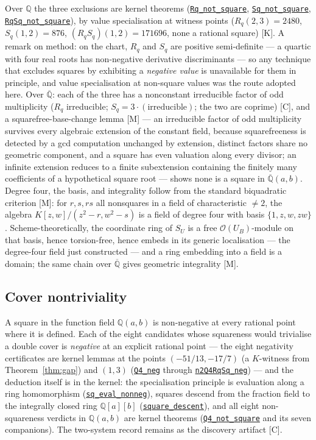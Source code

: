 \documentclass[11pt]{amsart}
\newcommand{\Q}{\mathbb{Q}}
\newcommand{\repourl}{https://github.com/hirokifukui/rd-quartics-classification}
\newcommand{\repotag}{v1.1.0}
\newcommand{\leanline}[3]{\href{\repourl/blob/\repotag/#1\#L#2}{\texttt{#3}}}
\begin{document}
Over $\Q$ the three exclusions are kernel theorems
(\leanline{Gap/BMThm7NormCriterion.lean}{60}{Rq\_not\_square},
\leanline{Gap/BMThm7NormCriterion.lean}{67}{Sq\_not\_square},
\leanline{Gap/BMThm7NormCriterion.lean}{76}{RqSq\_not\_square}), by
value specialisation at witness points
($R_{q}(2,3)=2480$, $S_{q}(1,2)=876$, $(R_{q}S_{q})(1,2)=171696$, none
a rational square) [K].  A remark on method: on the chart, $R_{q}$ and
$S_{q}$ are positive semi-definite --- a quartic with four real roots
has non-negative derivative discriminants --- so any technique that
excludes squares by exhibiting a \emph{negative value} is unavailable
for them in principle, and value specialisation at non-square values
was the route adopted here.  Over $\overline{\Q}$: each of the three has a
nonconstant irreducible factor of odd multiplicity ($R_{q}$
irreducible; $S_{q}=3\cdot(\text{irreducible})$; the two are coprime)
[C], and a squarefree-base-change lemma [M] --- an irreducible factor
of odd multiplicity survives every algebraic extension of the constant
field, because squarefreeness is detected by a gcd computation
unchanged by extension, distinct factors share no geometric component,
and a square has even valuation along every divisor; an infinite
extension reduces to a finite subextension containing the finitely
many coefficients of a hypothetical square root --- shows none is a
square in $\overline{\Q}(a,b)$.  Degree four, the basis, and
integrality follow from the standard biquadratic criterion [M]: for
$r,s,rs$ all nonsquares in a field of characteristic $\neq2$, the
algebra $K[z,w]/(z^{2}-r,w^{2}-s)$ is a field of degree four with
basis $\{1,z,w,zw\}$.  Scheme-theoretically, the coordinate ring of
$S_{U}$ is a free $\mathcal O(U_{B})$-module on that basis, hence
torsion-free, hence embeds in its generic localisation --- the
degree-four field just constructed --- and a ring embedding into a
field is a domain; the same chain over $\overline{\Q}$ gives geometric
integrality [M].

\subsection{Cover nontriviality}\label{sec:boundary:covers}

A square in the function field $\Q(a,b)$ is non-negative at every
rational point where it is defined.  Each of the eight candidates whose
squareness would trivialise a double cover is \emph{negative} at an
explicit rational point --- the eight negativity certificates are
kernel lemmas at the points $(-51/13,-17/7)$ (a $K$-witness from
Theorem~\ref{thm:gap}) and $(1,3)$
(\leanline{Gap/BMThm7Boundary.lean}{72}{Q4\_neg} through
\leanline{Gap/BMThm7Boundary.lean}{94}{n2Q4RqSq\_neg}) --- and the
deduction itself is in the kernel: the specialisation principle is
evaluation along a ring homomorphism
(\leanline{Gap/BMThm7FunctionField.lean}{108}{sq\_eval\_nonneg}),
squares descend from the fraction field to the integrally closed ring
$\Q[a][b]$
(\leanline{Gap/BMThm7FunctionField.lean}{117}{square\_descent}), and
all eight non-squareness verdicts in $\Q(a,b)$ are kernel theorems
(\leanline{Gap/BMThm7FunctionField.lean}{134}{Q4\_not\_square} and its
seven companions).  The two-system record remains as the discovery
artifact [C].
\end{document}
